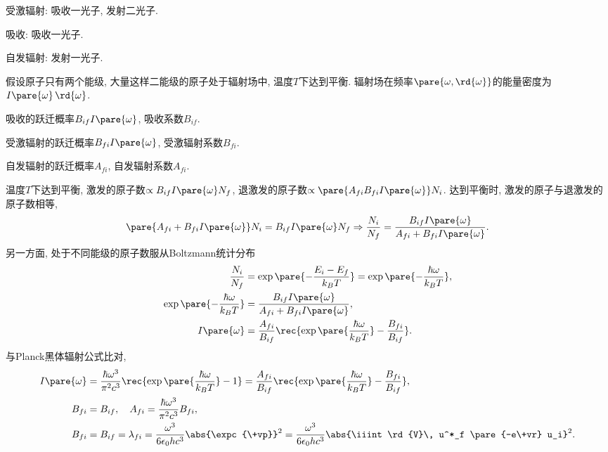 \documentclass[hidelinks]{ctexart}
\begin{document}
\begin{cenum}
    \item 受激辐射: 吸收一光子, 发射二光子.
    \item 吸收: 吸收一光子.
    \item 自发辐射: 发射一光子.
\end{cenum}
假设原子只有两个能级, 大量这样二能级的原子处于辐射场中, 温度$T$下达到平衡. 辐射场在频率$\pare{\omega,\rd{\omega}}$的能量密度为$I\pare{\omega}\,\rd{\omega}$.
\begin{cenum}
    \item 吸收的跃迁概率$B_{if}I\pare{\omega}$, 吸收系数$B_{if}$.
    \item 受激辐射的跃迁概率$B_{fi}I\pare{\omega}$, 受激辐射系数$B_{fi}$.
    \item 自发辐射的跃迁概率$A_{fi}$, 自发辐射系数$A_{fi}$.
\end{cenum}
温度$T$下达到平衡, 激发的原子数$\propto B_{if}I\pare{\omega}N_f$, 退激发的原子数$\propto \pare{A_{fi} B_{fi}I\pare{\omega}}N_i$. 达到平衡时, 激发的原子与退激发的原子数相等,
\[ \pare{A_{fi} + B_{fi}I\pare{\omega}}N_i = B_{if}I\pare{\omega}N_f \Rightarrow \frac{N_i}{N_f} = \frac{B_{if}I\pare{\omega}}{A_{fi} + B_{fi}I\pare{\omega}}. \]
另一方面, 处于不同能级的原子数服从Boltzmann统计分布
\begin{align*}
    \frac{N_i}{N_f} &= \exp\pare{-\frac{E_i - E_f}{k_BT}} = \exp\pare{-\frac{\hbar\omega}{k_BT}}, \\
    \exp\pare{-\frac{\hbar\omega}{k_BT}} &= \frac{B_{if}I\pare{\omega}}{A_{fi} + B_{fi} I\pare{\omega}}, \\
    I\pare{\omega} &= \frac{A_{fi}}{B_{if}} \rec{\displaystyle \exp\pare{\frac{\hbar\omega}{k_BT}} - \frac{B_{fi}}{B_{if}}}.
\end{align*}
与Planck黑体辐射公式比对,
\begin{align*}
    I\pare{\omega} &= \frac{\hbar\omega^3}{\pi^2 c^3} \rec{\displaystyle \exp\pare{\frac{\hbar\omega}{k_BT}} - 1} = \frac{A_{fi}}{B_{if}}\rec{\displaystyle \exp\pare{\frac{\hbar\omega}{k_BT}} - \frac{B_{fi}}{B_{if}}},\\
    B_{fi} &= B_{if},\quad A_{fi} = \frac{\hbar \omega^3}{\pi^2 c^3}B_{fi}, \\
    B_{fi} &= B_{if} = \lambda_{fi} = \frac{\omega^3}{6\epsilon_0 hc^3} \abs{\expc{\+vp}}^2 = \frac{\omega^3}{6\epsilon_0 hc^3}\abs{\iiint \rd{V}\, u^*_f \pare{-e\+vr} u_i}^2.
\end{align*}

\end{document}
